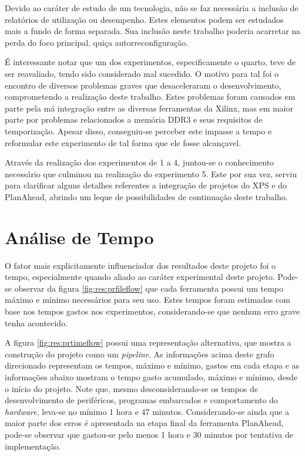 \documentclass[11pt,a4paper,oneside]{book}
\begin{document}
Devido ao caráter de estudo de um tecnologia, não se faz necessária a inclusão de relatórios de utilização ou desempenho.
Estes elementos podem ser estudados mais a fundo de forma separada.
Sua inclusão neste trabalho poderia acarretar na perda do foco principal, quiça autorreconfiguração.

É interessante notar que um dos experimentos, especificamente o quarto, teve de ser reavaliado, tendo sido considerado mal sucedido.
O motivo para tal foi o encontro de diversos problemas graves que desaceleraram o desenvolvimento, comprometendo a realização deste trabalho.
Estes problemas foram causados em parte pela má integração entre as diversas ferramentas da Xilinx, mas em maior parte por problemas relacionados a memória DDR3 e seus requisitos de temporização.
Apesar disso, conseguiu-se perceber este impasse a tempo e reformular este experimento de tal forma que ele fosse alcançavel.

Através da realização dos experimentos de 1 a 4, juntou-se o conhecimento necessário que culminou na realização do experimento 5.
Este por sua vez, serviu para clarificar alguns detalhes referentes a integração de projetos do XPS e do PlanAhead, abrindo um leque de possibilidades de continuação deste trabalho.

\section{Análise de Tempo}
O fator mais explicitamente influenciador dos resultados deste projeto foi o tempo, especialmente quando aliado ao caráter experimental deste projeto.
Pode-se observar da figura \ref{fig:res:prfileflow} que cada ferramenta possui um tempo máximo e mínimo necessários para seu uso.
Estes tempos foram estimados com base nos tempos gastos nos experimentos, considerando-se que nenhum erro grave tenha acontecido.

A figura \ref{fig:res:prtimeflow} possui uma representação alternativa, que mostra a construção do projeto como um \textit{pipeline}.
As informações acima deste grafo direcionado representam os tempos, máximo e mínimo, gastos em cada etapa e as informações abaixo mostram o tempo gasto acumulado, máximo e mínimo, desde o início do projeto.
Note que, mesmo desconsiderando-se os tempos de desenvolvimento de periféricos, programas embarcados e comportamento do \textit{hardware}, leva-se no mínimo 1 hora e 47 minutos.
Considerando-se ainda que a maior parte dos erros é apresentada na etapa final da ferramenta PlanAhead, pode-se observar que gastou-se pelo menos 1 hora e 30 minutos por tentativa de implementação.
\end{document}
